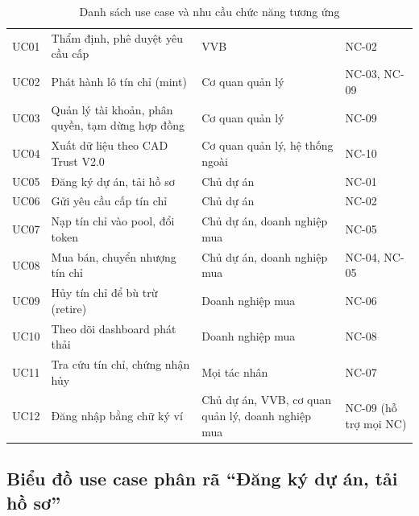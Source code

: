 \begin{table}[!htbp]
    \centering
    \caption{Danh sách use case và nhu cầu chức năng tương ứng}
    \label{tab:usecase}
    \small
    \begin{tabularx}{\textwidth}{|L{1.3cm}|Y|L{3.6cm}|L{2.2cm}|}
        \hline
         &  &  &  \\
        \hline
        UC01 & Thẩm định, phê duyệt yêu cầu cấp & VVB & NC-02 \\
        \hline
        UC02 & Phát hành lô tín chỉ (mint) & Cơ quan quản lý & NC-03, NC-09 \\
        \hline
        UC03 & Quản lý tài khoản, phân quyền, tạm dừng hợp đồng & Cơ quan quản lý & NC-09 \\
        \hline
        UC04 & Xuất dữ liệu theo CAD Trust V2.0 & Cơ quan quản lý, hệ thống ngoài & NC-10 \\
        \hline
        UC05 & Đăng ký dự án, tải hồ sơ & Chủ dự án & NC-01 \\
        \hline
        UC06 & Gửi yêu cầu cấp tín chỉ & Chủ dự án & NC-02 \\
        \hline
        UC07 & Nạp tín chỉ vào pool, đổi token & Chủ dự án, doanh nghiệp mua & NC-05 \\
        \hline
        UC08 & Mua bán, chuyển nhượng tín chỉ & Chủ dự án, doanh nghiệp mua & NC-04, NC-05 \\
        \hline
        UC09 & Hủy tín chỉ để bù trừ (retire) & Doanh nghiệp mua & NC-06 \\
        \hline
        UC10 & Theo dõi dashboard phát thải & Doanh nghiệp mua & NC-08 \\
        \hline
        UC11 & Tra cứu tín chỉ, chứng nhận hủy & Mọi tác nhân & NC-07 \\
        \hline
        UC12 & Đăng nhập bằng chữ ký ví & Chủ dự án, VVB, cơ quan quản lý, doanh nghiệp mua & NC-09 (hỗ trợ mọi NC) \\
        \hline
    \end{tabularx}
\end{table}

\FloatBarrier
\subsection*{Biểu đồ use case phân rã ``Đăng ký dự án, tải hồ sơ''}
\label{subsec:uc-duan}

